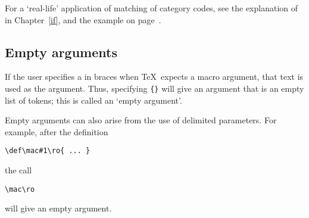 \documentclass[letterpaper]{book}
\begin{document}
For a `real-life' application of matching of category codes,
see the explanation of  in Chapter~\ref{if},
and the example on page~\pageref{ex:jobnumber}.


\subsection{Empty arguments}

If the user specifies a  in braces
when \TeX\ expects a macro
argument, that text is used as the argument.
Thus, specifying \verb-{}- will give an argument that is
an empty list of tokens; this is called an `empty argument'.

Empty arguments can also arise from the use of delimited
parameters. For example, after the definition
\begin{verbatim}
\def\mac#1\ro{ ... }
\end{verbatim}
the call
\begin{verbatim}
\mac\ro
\end{verbatim}
will give an empty argument. 
\end{document}
